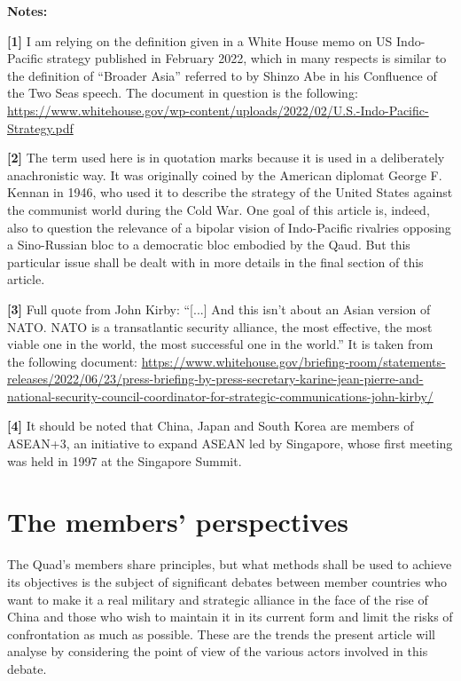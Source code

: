 \documentclass[11pt,a4paper]{article}
\begin{document}
\textbf{Notes:}

\textbf{{[}1{]}} I am relying on the definition given in a White House memo on US Indo-Pacific strategy published in February 2022, which in many respects is similar to the definition of “Broader Asia” referred to by Shinzo Abe in his Confluence of the Two Seas speech. The document in question is the following: \url{https://www.whitehouse.gov/wp-content/uploads/2022/02/U.S.-Indo-Pacific-Strategy.pdf}

\textbf{{[}2{]}} The term used here is in quotation marks because it is used in a deliberately anachronistic way. It was originally coined by the American diplomat George F. Kennan in 1946, who used it to describe the strategy of the United States against the communist world during the Cold War. One goal of this article is, indeed, also to question the relevance of a bipolar vision of Indo-Pacific rivalries opposing a Sino-Russian bloc to a democratic bloc embodied by the Qaud. But this particular issue shall be dealt with in more details in the final section of this article.

\textbf{{[}3{]}} Full quote from John Kirby: “[...] And this isn’t about an Asian version of NATO. NATO is a transatlantic security alliance, the most effective, the most viable one in the world, the most successful one in the world.” It is taken from the following document: \url{https://www.whitehouse.gov/briefing-room/statements-releases/2022/06/23/press-briefing-by-press-secretary-karine-jean-pierre-and-national-security-council-coordinator-for-strategic-communications-john-kirby/}

\textbf{{[}4{]}} It should be noted that China, Japan and South Korea are members of ASEAN+3, an initiative to expand ASEAN led by Singapore, whose first meeting was held in 1997 at the Singapore Summit.

\section{The members’ perspectives}

The Quad’s members share principles, but what methods shall be used to achieve its objectives is the subject of significant debates between member countries who want to make it a real military and strategic alliance in the face of the rise of China and those who wish to maintain it in its current form and limit the risks of confrontation as much as possible. These are the trends the present article will analyse by considering the point of view of the various actors involved in this debate.
\end{document}
